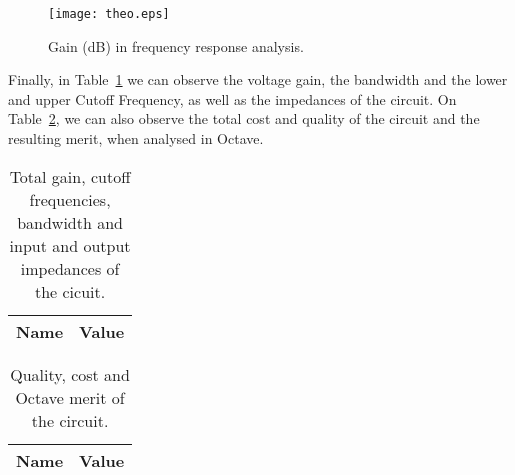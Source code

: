 
\begin{figure}[H] \centering
\texttt{[image: theo.eps]}
\caption{Gain (dB) in frequency response analysis.}
\label{fig:theo}
\end{figure}

Finally, in Table~\ref{tab:total} we can observe the voltage gain, the bandwidth and the lower and upper Cutoff Frequency, as well as the impedances of the circuit. On Table~\ref{tab:oct_merit}, we can also observe the total cost and quality of the circuit and the resulting merit, when analysed in Octave.

\begin{table}[H]
  \centering
  \begin{tabular}{|l|r|}
    \hline    
    {\bf Name} & {\bf Value} \\ \hline
	
  \end{tabular}
  \caption{Total gain, cutoff frequencies, bandwidth and input and output impedances of the cicuit.}
  \label{tab:total}
\end{table}

\begin{table}[H]
  \centering
  \begin{tabular}{|l|r|}
    \hline    
    {\bf Name} & {\bf Value} \\ \hline
	
  \end{tabular}
  \caption{Quality, cost and Octave merit of the circuit.}
  \label{tab:oct_merit}
\end{table}

